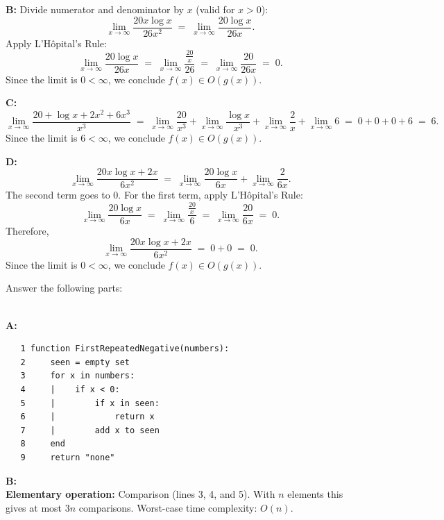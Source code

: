 \documentclass[10pt]{exam}
\begin{document}
\begin{questions}
\begin{solution}
    \textbf{B:}
    Divide numerator and denominator by $x$ (valid for $x > 0$):
    \[
        \lim_{x \to \infty} \frac{20x\log x}{26x^2}
        \;=\; \lim_{x \to \infty} \frac{20\log x}{26x}.
    \]
    Apply L'H\^{o}pital's Rule:
    \[\lim_{x \to \infty} \frac{20\log x}{26x}
        \;=\; \lim_{x \to \infty} \frac{\tfrac{20}{x}}{26}
        \;=\; \lim_{x \to \infty} \frac{20}{26x}\;=\; 0.\]
    Since the limit is $0 < \infty$, we conclude $f(x) \in O(g(x))$.
 
    \textbf{C:}
    \[\lim_{x \to \infty} \frac{20 + \log x + 2x^2 + 6x^3}{x^3}
        \;=\;\lim_{x \to \infty}\frac{20}{x^3}+ \lim_{x \to \infty}\frac{\log x}{x^3}+ \lim_{x \to \infty}\frac{2}{x}
        + \lim_{x \to \infty} 6\;=\; 0 + 0 + 0 + 6\;=\; 6.\]
    Since the limit is $6 < \infty$, we conclude $f(x) \in O(g(x))$.
 
    \textbf{D:}
    \[\lim_{x \to \infty} \frac{20x\log x + 2x}{6x^2}
        \;=\;\lim_{x \to \infty} \frac{20\log x}{6x}
        + \lim_{x \to \infty} \frac{2}{6x}.\]
    The second term goes to $0$. For the first term, apply L'H\^{o}pital's Rule:
    \[\lim_{x \to \infty} \frac{20\log x}{6x}
        \;=\; \lim_{x \to \infty} \frac{\tfrac{20}{x}}{6}\;=\; \lim_{x \to \infty} \frac{20}{6x}\;=\; 0.\]
    Therefore,
    \[\lim_{x \to \infty} \frac{20x\log x + 2x}{6x^2} \;=\; 0 + 0 \;=\; 0.\]
    Since the limit is $0 < \infty$, we conclude $f(x) \in O(g(x))$.
\end{solution}

\question[8] Answer the following parts:

\begin{solution}\\
    \textbf{A:}
    \begin{verbatim}
   1 function FirstRepeatedNegative(numbers):
   2     seen = empty set
   3     for x in numbers:
   4     |    if x < 0:
   5     |        if x in seen:
   6     |            return x
   7     |        add x to seen
   8     end
   9     return "none"
    \end{verbatim}
    \textbf{B:}\\
    \textbf{Elementary operation:} Comparison (lines 3, 4, and 5).
    With $n$ elements this gives at most $3n$ comparisons.
    Worst-case time complexity: $O(n)$.
\end{solution}


\end{questions}
\end{document}

